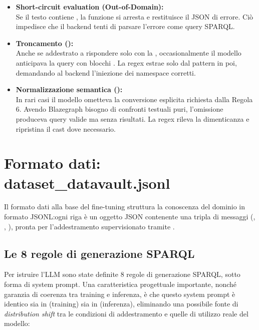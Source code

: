 \begin{itemize}
    \item \textbf{Short-circuit evaluation (Out-of-Domain):} \\ 
    Se il testo contiene , la funzione si arresta e restituisce il JSON di errore. Ciò impedisce che il backend tenti di parsare l'errore come query SPARQL.\@
    
    \item \textbf{Troncamento ():} \\
    Anche se addestrato a rispondere solo con la , occasionalmente il modello anticipava la query con blocchi . La regex estrae solo dal pattern  in poi, demandando al backend l'iniezione dei namespace corretti.
    
    \item \textbf{Normalizzazione semantica ():} \\
    In rari casi il modello ometteva la conversione esplicita  richiesta dalla Regola 6. Avendo Blazegraph bisogno di confronti testuali puri, l'omissione produceva query valide ma senza risultati. La regex rileva la dimenticanza e ripristina il cast  dove necessario. %
\end{itemize}

\newpage
\section{Formato dati: dataset\_datavault.jsonl}\label{sec:dataset}

Il formato dati alla base del fine-tuning struttura la conoscenza del dominio in formato JSONL:\@ ogni riga è un oggetto JSON contenente una tripla di messaggi (, , ), pronta per l'addestramento supervisionato tramite .

\subsection{Le 8 regole di generazione SPARQL}\label{subsec:regole}

Per istruire l'LLM sono state definite 8 regole di generazione SPARQL, sotto forma di system prompt. 
Una caratteristica progettuale importante, nonché garanzia di coerenza tra training e inferenza, è che questo system prompt è identico sia in  (training) sia in  (inferenza), eliminando una possibile fonte di \textit{distribution shift} tra le condizioni di addestramento e quelle di utilizzo reale del modello:

